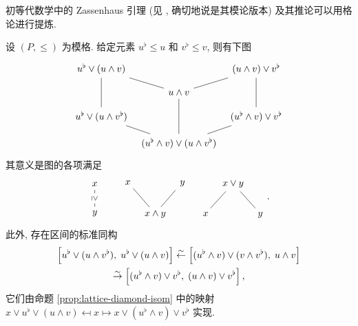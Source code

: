 初等代数学中的 Zassenhaus 引理 (见 \cite[引理 4.6.4]{Li1}, 确切地说是其模论版本) 及其推论可以用格论进行提炼.

\begin{theorem}\label{prop:lattice-Zassenhaus}
	设 $(P, \leq)$ 为模格. 给定元素 $u^\flat \leq u$ 和 $v^\flat \leq v$, 则有下图
	\[ \begin{tikzcd}[column sep=tiny, row sep=small]
		u^\flat \vee (u \wedge v) \arrow[dash, dd] \arrow[dash, rd] & & (u \wedge v) \vee v^\flat \arrow[dash, dd] \arrow[dash, ld] \\
		& u \wedge v \arrow[dash, dd] & \\
		u^\flat \vee (u \wedge v^\flat) \arrow[dash, rd] & & (u^\flat \wedge v) \vee v^\flat \arrow[dash, ld] \\
		& (u^\flat \wedge v) \vee (u \wedge v^\flat)
	\end{tikzcd} \]
	其意义是图的各项满足
	\begin{equation}\label{eqn:Zassenhaus-cases} \begin{tikzcd}
		x \arrow[dash, d, "\geq" description, sloped] \\ y
	\end{tikzcd} \qquad
	\begin{tikzcd}[column sep=tiny]
		x \arrow[dash, rd] & & y \arrow[dash, ld] \\
		& x \wedge y &
	\end{tikzcd} \quad
	\begin{tikzcd}[column sep=tiny]
		{} & x \vee y \arrow[dash, ld] \arrow[dash, rd] & \\
		x & & y
	\end{tikzcd} . \end{equation}
	此外, 存在区间的标准同构
	\begin{multline*}
		\left[ u^\flat \vee (u \wedge v^\flat), \; u^\flat \vee (u \wedge v) \right] \stackrel{\sim}{\leftarrow} \left[ (u^\flat \wedge v) \vee (v \wedge v^\flat), \; u \wedge v \right] \\
		\stackrel{\sim}{\rightarrow} \left[ (u^\flat \wedge v) \vee v^\flat, \; (u \wedge v) \vee v^\flat \right],
	\end{multline*}
	它们由命题 \ref{prop:lattice-diamond-isom} 中的映射 $x \vee u^\flat \vee (u \wedge v) \mapsfrom x \mapsto x \vee (u^\flat \wedge v) \vee v^\flat$ 实现.
\end{theorem}
